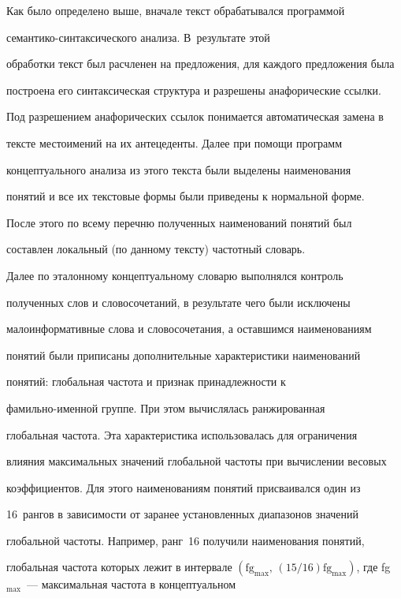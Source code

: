     Как было определено выше, вначале текст обрабатывался программой 

     се\-ман\-ти\-ко-син\-так\-си\-че\-ско\-го анализа. В~результате этой 

обработки текст был расчленен на предложения, для каждого предложения была 

построена его синтаксическая структура и разрешены анафорические ссылки. 

Под разрешением анафорических ссылок понимается автоматическая замена в 

тексте местоимений на их антецеденты. Далее при помощи программ 

концептуального анализа из этого текста были выделены наименования 

понятий и все их текстовые формы были приведены к нормальной форме. 

После этого по всему перечню полученных наименований понятий был 

составлен локальный (по данному тексту) частотный словарь. 

     

     Далее по эталонному концептуальному словарю выполнялся контроль 

полученных слов и словосочетаний, в результате чего были исключены 

малоинформативные слова и словосочетания, а оставшимся наименованиям 

понятий были приписаны дополнительные характеристики наименований 

понятий: глобальная частота и признак принадлежности к 

     фа\-миль\-но-имен\-ной группе. При этом вычислялась ранжированная 

глобальная частота. Эта характеристика использовалась для ограничения 

влияния максимальных значений глобальной частоты при вычислении весовых 

коэффициентов. Для этого наименованиям понятий присваивался один из 

16~рангов в зависимости от заранее установленных диапазонов значений 

глобальной частоты. Например, ранг~16 получили наименования понятий, 

глобальная частота которых лежит в интервале $(\mathrm{fg}_{\max},\,(15/16) 

\mathrm{fg}_{\max})$, где fg$_{\max}$~--- максимальная частота в концептуальном 

